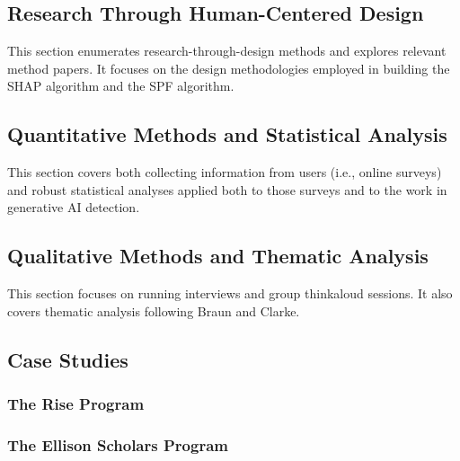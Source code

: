 \subsection{Research Through Human-Centered Design}
This section enumerates research-through-design methods and explores relevant method papers. It focuses on the design methodologies employed in building the SHAP algorithm and the SPF algorithm.

\subsection{Quantitative Methods and Statistical Analysis}
This section covers both collecting information from users (i.e., online surveys) and robust statistical analyses applied both to those surveys and to the work in generative AI detection.

\subsection{Qualitative Methods and Thematic Analysis}
This section focuses on running interviews and group thinkaloud sessions. It also covers thematic analysis following Braun and Clarke.

\subsection{Case Studies}
\subsubsection{The Rise Program}
\subsubsection{The Ellison Scholars Program}

